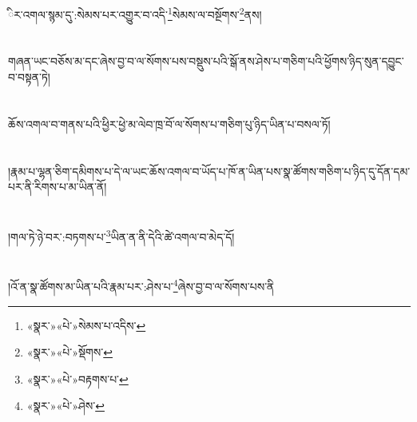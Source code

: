 ིར་འགལ་སྙམ་དུ་:སེམས་པར་འགྱུར་བ་འདི་\footnote{«སྣར་»«པེ་»སེམས་པ་འདིས་}སེམས་ལ་བསྔོགས་\footnote{«སྣར་»«པེ་»སྡོགས་}ནས།\chapter{ }གཞན་ཡང་བཅོས་མ་དང་ཞེས་བྱ་བ་ལ་སོགས་པས་བསྡུས་པའི་སྒོ་ནས་ཤེས་པ་གཅིག་པའི་ཕྱོགས་ཉིད་སུན་དབྱུང་བ་བསྟན་ཏེ།\chapter{ }ཆོས་འགལ་བ་གནས་པའི་ཕྱིར་ཕྱེ་མ་ལེབ་ཁྲ་བོ་ལ་སོགས་པ་གཅིག་པུ་ཉིད་ཡིན་པ་བསལ་ཏོ།\chapter{ }།རྣམ་པ་ལྷན་ཅིག་དམིགས་པ་དེ་ལ་ཡང་ཆོས་འགལ་བ་ཡོད་པ་ཁོ་ན་ཡིན་པས་སྣ་ཚོགས་གཅིག་པ་ཉིད་དུ་དོན་དམ་པར་ནི་རིགས་པ་མ་ཡིན་ནོ།\chapter{ }།གལ་ཏེ་ཉེ་བར་:བཏགས་པ་\footnote{«སྣར་»«པེ་»བརྟགས་པ་}ཡིན་ན་ནི་དེའི་ཚེ་འགལ་བ་མེད་དོ།\chapter{ }།འོ་ན་སྣ་ཚོགས་མ་ཡིན་པའི་རྣམ་པར་:ཤེས་པ་\footnote{«སྣར་»«པེ་»ཤེས་}ཞེས་བྱ་བ་ལ་སོགས་པས་ནི